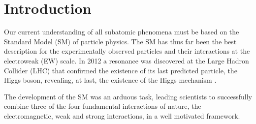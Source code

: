 \documentclass[10pt]{book}
\renewcommand{\(}{\left(}
\renewcommand{\)}{\right)}
\renewcommand{\[}{\left[}
\renewcommand{\]}{\right]}
\begin{document}
\tableofcontents

\cleardoublepage
\listoffigures

\cleardoublepage
\listoftables

\cleardoublepage

\setcounter{page}{1}


\newpage
% 

\renewcommand{\cleardoublepage}{}
\renewcommand{\clearpage}{}

\chapter{Introduction}
\label{Chap:Introduction}

Our current understanding of all subatomic phenomena must be based on the Standard Model (SM) of particle physics. 
%
The SM has thus far been the best description for the experimentally observed particles and their interactions at the electroweak (EW) scale. 
%
In 2012 a resonance was discovered at the Large Hadron Collider (LHC) that confirmed the existence of its last predicted particle, the Higgs boson, revealing, at last, the existence of the Higgs mechanism \cite{collaborations2016measurements}. 

The development of the SM was an arduous task, leading scientists to successfully combine three of the four fundamental interactions of nature, the electromagnetic, weak and strong interactions, in a well motivated framework. 
\end{document}
